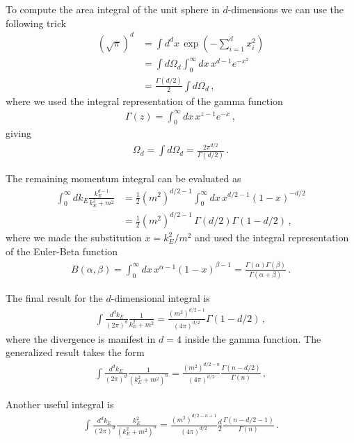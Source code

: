To compute the area integral of the unit sphere in $d$-dimensions we can use the following trick
\begin{align}
    (\sqrt{\pi})^{d}&=\int d^{d}x\,\exp(-\sum_{i=1}^{d}x_{i}^{2})\nonumber
    \\
    &=\int d\Omega_{d}\int_{0}^{\infty}dx\,x^{d-1}e^{-x^{2}}\nonumber
    \\
    &=\frac{\Gamma(d/2)}{2}\int d\Omega_{d}\,,
\end{align}
where we used the integral representation of the gamma function
\begin{align}
    \Gamma(z)=\int_{0}^{\infty}dx\,x^{z-1}e^{-x}\,,
\end{align}
giving
\begin{align}\label{eq:d-dimensional sphere area}
    \Omega_{d}=\int d\Omega_{d}=\frac{2\pi^{d/2}}{\Gamma(d/2)}\,.
\end{align}

The remaining momentum integral can be evaluated as
\begin{align}
    \int_{0}^{\infty}dk_{E}\frac{k_{E}^{d-1}}{k_{E}^{2}+m^{2}}&=\frac{1}{2}(m^{2})^{d/2-1}\int_{0}^{\infty}dx\,x^{d/2-1}(1-x)^{-d/2}\nonumber
    \\
    &=\frac{1}{2}(m^{2})^{d/2-1}\,\Gamma(d/2)\Gamma(1-d/2)\,,
\end{align}
where we made the substitution $x=k_{E}^{2}/m^{2}$ and used the integral representation of the Euler-Beta function
\begin{align}
    B(\alpha,\beta)=\int_{0}^{\infty}dx\,x^{\alpha-1}(1-x)^{\beta-1}=\frac{\Gamma(\alpha)\Gamma(\beta)}{\Gamma(\alpha+\beta)}\,.
\end{align}

The final result for the $d$-dimensional integral is
\begin{align}
    \int\frac{d^{d}k_{E}}{(2\pi)^{d}}\frac{1}{k_{E}^{2}+m^{2}}=\frac{(m^{2})^{d/2-1}}{(4\pi)^{d/2}}\Gamma(1-d/2)\,,
\end{align}
where the divergence is manifest in $d=4$ inside the gamma function. The generalized result takes the form
\begin{align}\label{eq:Wick rotated integral}
    \int\frac{d^{d}k_{E}}{(2\pi)^{d}}\frac{1}{(k_{E}^{2}+m^{2})^{n}}=\frac{(m^{2})^{d/2-n}}{(4\pi)^{d/2}}\frac{\Gamma(n-d/2)}{\Gamma(n)}\,,
\end{align}

Another useful integral is
\begin{align}\label{eq:Wick rotated k2 integral}
    \int\frac{d^{d}k_{E}}{(2\pi)^{d}}\frac{k_{E}^{2}}{(k_{E}^{2}+m^{2})^{n}}=\frac{(m^{2})^{d/2-n+1}}{(4\pi)^{d/2}}\frac{d}{2}\frac{\Gamma(n-d/2-1)}{\Gamma(n)}\,.
\end{align}

